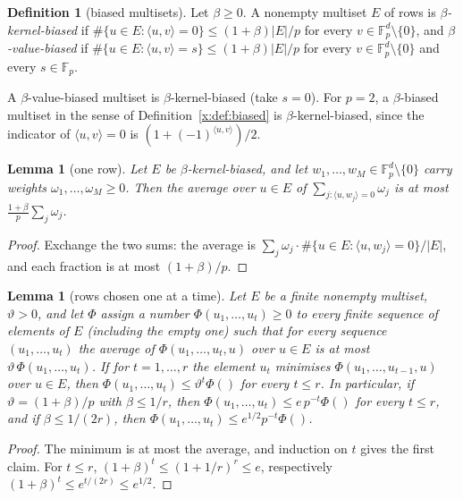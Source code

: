 \documentclass[11pt]{article}
\newtheorem{lemma}[theorem]{Lemma}
\theoremstyle{definition}
\newtheorem{definition}[theorem]{Definition}
\theoremstyle{remark}
\newcommand{\Fp}{\mathbb{F}_p}
\begin{document}
\begin{definition}[biased multisets]\label{g:def:biased}
Let $\beta\ge0$. A nonempty multiset $E$ of rows is \emph{$\beta$-kernel-biased} if $\#\{u\in E:\langle u,v\rangle=0\}\le(1+\beta)|E|/p$ for every $v\in\Fp^d\setminus\{0\}$, and \emph{$\beta$-value-biased} if $\#\{u\in E:\langle u,v\rangle=s\}\le(1+\beta)|E|/p$ for every $v\in\Fp^d\setminus\{0\}$ and every $s\in\Fp$.
\end{definition}

A $\beta$-value-biased multiset is $\beta$-kernel-biased (take $s=0$). For $p=2$, a $\beta$-biased multiset in the sense of Definition~\ref{x:def:biased} is $\beta$-kernel-biased, since the indicator of $\langle u,v\rangle=0$ is $(1+(-1)^{\langle u,v\rangle})/2$.

\begin{lemma}[one row]\label{g:lem:onerow}
Let $E$ be $\beta$-kernel-biased, and let $w_1,\dots,w_M\in\Fp^d\setminus\{0\}$ carry weights $\omega_1,\dots,\omega_M\ge0$. Then the average over $u\in E$ of $\sum_{j:\langle u,w_j\rangle=0}\omega_j$ is at most $\frac{1+\beta}p\sum_j\omega_j$.
\end{lemma}
\begin{proof}
Exchange the two sums: the average is $\sum_j\omega_j\cdot\#\{u\in E:\langle u,w_j\rangle=0\}/|E|$, and each fraction is at most $(1+\beta)/p$.
\end{proof}

\begin{lemma}[rows chosen one at a time]\label{g:lem:greedy}
Let $E$ be a finite nonempty multiset, $\vartheta>0$, and let $\Phi$ assign a number $\Phi(u_1,\dots,u_t)\ge0$ to every finite sequence of elements of $E$ (including the empty one) such that for every sequence $(u_1,\dots,u_t)$ the average of $\Phi(u_1,\dots,u_t,u)$ over $u\in E$ is at most $\vartheta\,\Phi(u_1,\dots,u_t)$. If for $t=1,\dots,r$ the element $u_t$ minimises $\Phi(u_1,\dots,u_{t-1},u)$ over $u\in E$, then $\Phi(u_1,\dots,u_t)\le\vartheta^t\Phi()$ for every $t\le r$. In particular, if $\vartheta=(1+\beta)/p$ with $\beta\le1/r$, then $\Phi(u_1,\dots,u_t)\le e\,p^{-t}\Phi()$ for every $t\le r$, and if $\beta\le1/(2r)$, then $\Phi(u_1,\dots,u_t)\le e^{1/2}p^{-t}\Phi()$.
\end{lemma}
\begin{proof}
The minimum is at most the average, and induction on $t$ gives the first claim. For $t\le r$, $(1+\beta)^t\le(1+1/r)^r\le e$, respectively $(1+\beta)^t\le e^{t/(2r)}\le e^{1/2}$.
\end{proof}
\end{document}
